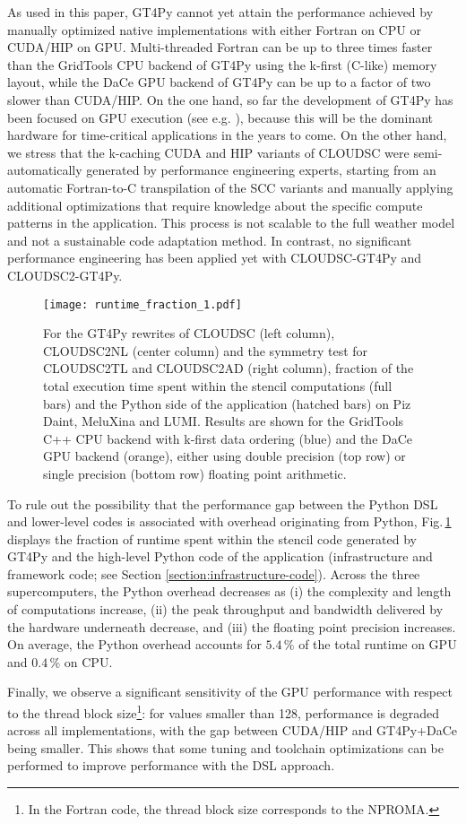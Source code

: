 \documentclass[main.tex]{subfiles}
\begin{document}
        As used in this paper, GT4Py cannot yet attain the performance achieved by manually optimized native implementations with either Fortran on CPU or CUDA/HIP on GPU. Multi-threaded Fortran can be up to three times faster than the GridTools CPU backend of GT4Py using the k-first (C-like) memory layout, while the DaCe GPU backend of GT4Py can be up to a factor of two slower than CUDA/HIP. On the one hand, so far the development of GT4Py has been focused on GPU execution (see e.g. \cite{dahm23}), because this will be the dominant hardware for time-critical applications in the years to come. On the other hand, we stress that the k-caching CUDA and HIP variants of CLOUDSC were semi-automatically generated by performance engineering experts, starting from an automatic Fortran-to-C transpilation of the SCC variants and manually applying additional optimizations that require knowledge about the specific compute patterns in the application. This process is not scalable to the full weather model and not a sustainable code adaptation method. In contrast, no significant performance engineering has been applied yet with CLOUDSC-GT4Py and CLOUDSC2-GT4Py.

        \begin{figure}[t!]
            \centering
            \texttt{[image: runtime\_fraction\_1.pdf]}
            \caption{For the GT4Py rewrites of CLOUDSC (left column), CLOUDSC2NL (center column) and the symmetry test for CLOUDSC2TL and CLOUDSC2AD (right column), fraction of the total execution time spent within the stencil computations (full bars) and the Python side of the application (hatched bars) on Piz Daint, MeluXina and LUMI. Results are shown for the GridTools C++ CPU backend with k-first data ordering (blue) and the DaCe GPU backend (orange), either using double precision (top row) or single precision (bottom row) floating point arithmetic.}
            \label{fig:runtime-fraction}
        \end{figure}

        To rule out the possibility that the performance gap between the Python DSL and lower-level codes is associated with overhead originating from Python, Fig.\,\ref{fig:runtime-fraction} displays the fraction of runtime spent within the stencil code generated by GT4Py and the high-level Python code of the application (infrastructure and framework code; see Section \ref{section:infrastructure-code}). Across the three supercomputers, the Python overhead decreases as (i) the complexity and length of computations increase, (ii) the peak throughput and bandwidth delivered by the hardware underneath decrease, and (iii) the floating point precision increases. On average, the Python overhead accounts for $5.4\,\%$ of the total runtime on GPU and $0.4\,\%$ on CPU.

        Finally, we observe a significant sensitivity of the GPU performance with respect to the thread block size\footnote{In the Fortran code, the thread block size corresponds to the NPROMA.}: for values smaller than 128, performance is degraded across all implementations, with the gap between CUDA/HIP and GT4Py+DaCe being smaller. This shows that some tuning and toolchain optimizations can be performed to improve performance with the DSL approach.

    \biblio
\end{document}
